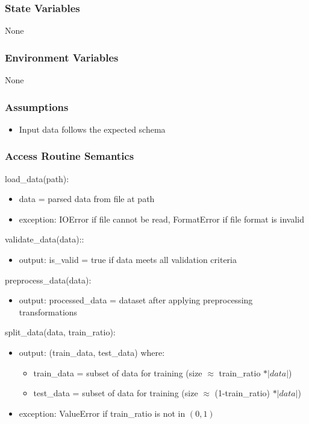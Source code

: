 \documentclass[12pt, titlepage]{article}
\begin{document}
\subsubsection{State Variables}
None

\subsubsection{Environment Variables}

None

\subsubsection{Assumptions}

\begin{itemize}
  \item Input data follows the expected schema
\end{itemize}

\subsubsection{Access Routine Semantics}

\noindent load\_data(path):
\begin{itemize}
\item data = parsed data from file at path
\item exception: IOError if file cannot be read, FormatError if file format is invalid
\end{itemize}

\noindent validate\_data(data)::
\begin{itemize}
\item output: is\_valid = true if data meets all validation criteria
\end{itemize}

\noindent preprocess\_data(data):
\begin{itemize}
\item output: processed\_data = dataset after applying preprocessing transformations
\end{itemize}

\noindent split\_data(data, train\_ratio):
\begin{itemize}
\item output: (train\_data, test\_data) where:
\begin{itemize}
  \item train\_data = subset of data for training (size $\approx$ train\_ratio $* |data|$)
  \item test\_data = subset of data for training (size $\approx$ (1-train\_ratio) $* |data|$)
\end{itemize}
\item exception: ValueError if train\_ratio is not in $(0,1)$
\end{itemize}
\end{document}
